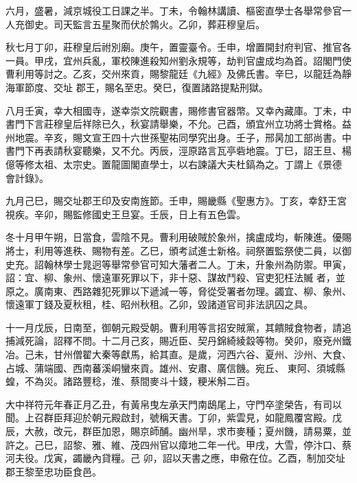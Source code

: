 \begin{pinyinscope}
 六月，盛暑，減京城役工日課之半。丁未，令翰林講讀、樞密直學士各舉常參官一人充御史。司天監言五星聚而伏於鶉火。乙卯，葬莊穆皇后。



 秋七月丁卯，莊穆皇后祔別廟。庚午，置靈臺令。壬申，增置開封府判官、推官各一員。甲戌，宜州兵亂，軍校陳進殺知州劉永規等，劫判官盧成均為首。詔閣門使曹利用等討之。乙亥，交州來貢，賜黎龍廷《九經》及佛氏書。辛巳，以龍廷為靜海軍節度、交址
 郡王，賜名至忠。癸巳，復置諸路提點刑獄。



 八月壬寅，幸大相國寺，遂幸崇文院觀書，賜修書官器幣。又幸內藏庫。丁未，中書門下言莊穆皇后祥除已久，秋宴請舉樂，不允。己酉，頒宜州立功將士賞格。益州地震。辛亥，賜文宣王四十六世孫聖祐同學究出身。壬子，邢昺加工部尚書。中書門下再表請秋宴聽樂，又不允。丙辰，涇原路言瓦亭砦地震。丁巳，詔王旦、楊億等修太祖、太宗史。置龍圖閣直學士，以右諫議大夫杜鎬為之。丁謂上《景德
 會計錄》。



 九月己巳，賜交址郡王印及安南旌節。壬申，賜畿縣《聖惠方》。丁亥，幸舒王宮視疾。辛卯，賜監修國史王旦宴。壬辰，日上有五色雲。



 冬十月甲午朔，日當食，雲陰不見。曹利用破賊於象州，擒盧成均，斬陳進。優賜將士，利用等進秩、賜物有差。乙巳，頒考試進士新格。祠祭置監祭使二員，以御史充。詔翰林學士晁迥等舉常參官可知大藩者二人。丁未，升象州為防禦。甲寅，詔：宜、柳、象州、懷遠軍死罪以下，非十惡、謀故鬥殺、官吏犯枉法贓
 者，並原之。廣南東、西路雜犯死罪以下遞減一等，脅從受署者勿理。蠲宜、柳、象州、懷遠軍丁錢及夏秋租，桂、昭州秋租。乙卯，毀諸道官司非法訊囚之具。



 十一月戊辰，日南至，御朝元殿受朝。曹利用等言招安賊黨，其饋賊食物者，請追捕減死論，詔釋不問。十二月己亥，賜近臣、契丹錦綺綾縠等物。癸卯，廢兗州鐵冶。己未，甘州僧翟大秦等獻馬，給其直。是歲，河西六谷、夏州、沙州、大食、占城、蒲端國、西南蕃溪峒蠻來貢。雄州、安肅、廣信饑。宛丘、
 東阿、須城縣蝗，不為災。諸路豐稔，淮、蔡間麥斗十錢，粳米斛二百。



 大中祥符元年春正月乙丑，有黃帛曳左承天門南鴟尾上，守門卒塗榮告，有司以聞。上召群臣拜迎於朝元殿啟封，號稱天書。丁卯，紫雲見，如龍鳳覆宮殿。戊辰，大赦，改元，群臣加恩，賜京師酺。幽州旱，求市麥種；夏州饑，請易粟，並許之。己巳，詔黎、雅、維、茂四州官以瘴地二年一代。甲戌，大雪，停汴口、蔡河夫役。戊寅，蠲畿內貸糧。己
 卯，詔以天書之應，申儆在位。乙酉，制加交址郡王黎至忠功臣食邑。




\end{pinyinscope}
